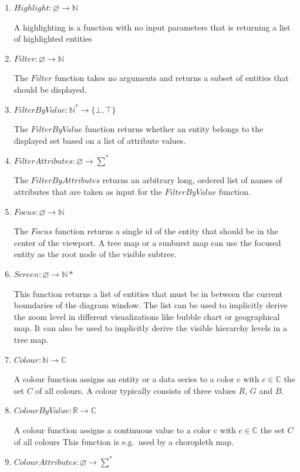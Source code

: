 \documentclass{article}
\begin{document}
\begin{enumerate}
    \item
        $ Highlight: \varnothing \rightarrow \mathbb{N}$

        A highlighting is a function with no input parameters that is returning a list of highlighted entities
    \item
        $ Filter: \varnothing \rightarrow \mathbb{N} $

        The $Filter$ function takes no arguments and returns a subset of entities that should be displayed.
    \item
        $ FilterByValue: \mathbb{N^*} \rightarrow \{ \bot, \top \} $

        The $FilterByValue$ function returns whether an entity belongs to the displayed set based on a list of attribute values.
    \item
        $ FilterAttributes: \varnothing \rightarrow \sum^* $

        The $FilterByAttributes$ returns an arbitrary long, ordered list of names of attributes that are taken as input for the $ FilterByValue $ function.
    \item
        $ Focus: \varnothing \rightarrow \mathbb{N} $

        The $ Focus $ function returns a single id of the entity that should be in the center of the viewport.
        A tree map or a sunburst map can use the focused entity as the root node of the visible subtree.
    \item
        $ Screen: \varnothing \rightarrow \mathbb{N}* $

        This function returns a list of entities that must be in between the current boundaries of the diagram window.
        The list can be used to implicitly derive the zoom level in different visualizations like bubble chart or geographical map.
        It can also be used to implicitly derive the visible hierarchy levels in a tree map.
    \item
        $ Colour: \mathbb{N} \rightarrow \mathbb{C} $

        A colour function assigns an entity or a data series to a color c with $ c \in \mathbb{C} $ the set $C$ of all colours.
        A colour typically consists of three values $R$, $G$ and $B$.
    \item
        $ ColourByValue: \mathbb{R} \rightarrow \mathbb{C} $

        A colour function assigns a continuous value to a color c with $ c \in \mathbb{C} $ the set $C$ of all colours
        This function is e.g.\ used by a choropleth map.
    \item
        $ ColourAttributes: \varnothing \rightarrow \sum^* $


\end{enumerate}
\end{document}
